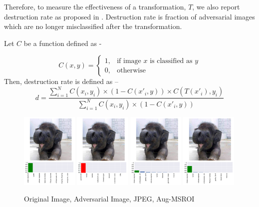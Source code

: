Therefore, to measure the effectiveness of a transformation, $T$, we also report destruction rate as proposed in \cite{Kurakin2016AdversarialEI}. 
Destruction rate is fraction of adversarial images which are no longer misclassified after the transformation. 

Let $C$ be a function defined as -

\[
C(x,y) = \begin{cases}
  1, & \text{if image $x$ is classified as $y$} \\
  0, & \text{otherwise}
\end{cases}
\]
Then, destruction rate is defined as --
\[
d = \frac{\sum_{i=1}^N C(x_i, y_i) \times (1 - C(x'_i,y)) \times C(T(x'_i),y_i)}{\sum_{i=1}^N C(x_i, y_i) \times (1 - C(x'_i,y))}
\]


\begin{figure}[H]
   \centering
     \includegraphics[width=0.24\textwidth,angle=0]{figures/protect/ori.pdf}
     \includegraphics[width=0.24\textwidth,angle=0]{figures/protect/adv.pdf}
     \includegraphics[width=0.24\textwidth,angle=0]{figures/protect/jpg.pdf}
     \includegraphics[width=0.24\textwidth,angle=0]{figures/protect/msroi.pdf}
              \caption[Augmented Multi-Structure ROI]{Original Image, Adversarial Image, JPEG, Aug-MSROI }
     \label{fig:compare}
 \end{figure}
 
